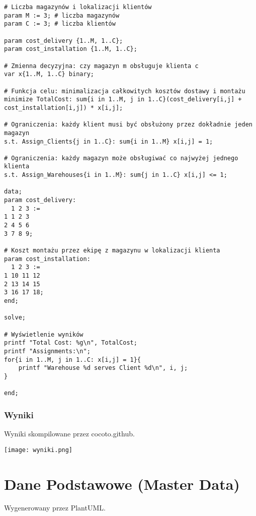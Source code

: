 \begin{tiny}
\begin{verbatim}
# Liczba magazynów i lokalizacji klientów
param M := 3; # liczba magazynów
param C := 3; # liczba klientów

param cost_delivery {1..M, 1..C};
param cost_installation {1..M, 1..C};

# Zmienna decyzyjna: czy magazyn m obsługuje klienta c
var x{1..M, 1..C} binary;

# Funkcja celu: minimalizacja całkowitych kosztów dostawy i montażu
minimize TotalCost: sum{i in 1..M, j in 1..C}(cost_delivery[i,j] + cost_installation[i,j]) * x[i,j];

# Ograniczenia: każdy klient musi być obsłużony przez dokładnie jeden magazyn
s.t. Assign_Clients{j in 1..C}: sum{i in 1..M} x[i,j] = 1;

# Ograniczenia: każdy magazyn może obsługiwać co najwyżej jednego klienta
s.t. Assign_Warehouses{i in 1..M}: sum{j in 1..C} x[i,j] <= 1;

data;
param cost_delivery:
  1 2 3 :=
1 1 2 3
2 4 5 6	
3 7 8 9;

# Koszt montażu przez ekipę z magazynu w lokalizacji klienta
param cost_installation:
  1 2 3 :=
1 10 11 12
2 13 14 15
3 16 17 18;
end;

solve;

# Wyświetlenie wyników
printf "Total Cost: %g\n", TotalCost;
printf "Assignments:\n";
for{i in 1..M, j in 1..C: x[i,j] = 1}{
    printf "Warehouse %d serves Client %d\n", i, j;
}

end;
\end{verbatim}

\end{tiny}

\subsubsection*{Wyniki}

Wyniki skompilowane przez cocoto.github\cite{glpk}.

\begin{center}
    \texttt{[image: wyniki.png]}\\[0.5cm]
\end{center}

\section{Dane Podstawowe (Master Data)}
Wygenerowany przez PlantUML\cite{plant}.
